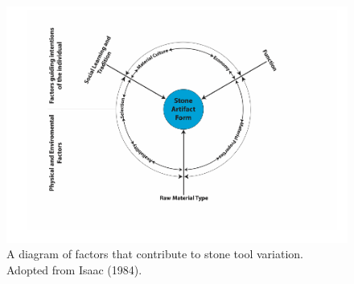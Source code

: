 \documentclass[]{elsarticle} %
\makeatletter
\def\maxwidth{\ifdim\Gin@nat@width>\linewidth\linewidth
\else\Gin@nat@width\fi}
\let\Oldincludegraphics\includegraphics
\renewcommand{\includegraphics}[1]{\Oldincludegraphics[width=\maxwidth]{#1}}
\makeatother
\begin{document}
\begin{figure}
\centering
\includegraphics{Reeves_Braun_et_al_2020_Kanjera_South_JHE_files/figure-latex/unnamed-chunk-1-1.pdf}
\caption{A diagram of factors that contribute to stone tool variation.
Adopted from Isaac (1984). \label{variation}}
\end{figure}
\end{document}
